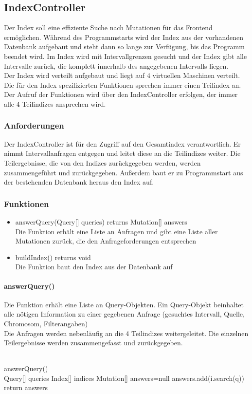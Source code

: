 \subsection{IndexController}
Der Index soll eine effiziente Suche nach Mutationen für das Frontend ermöglichen. Während des Programmstarts wird der Index aus der vorhandenen Datenbank aufgebaut und steht dann so lange zur Verfügung, bis das Programm beendet wird.
Im Index wird mit Intervallgrenzen gesucht und der Index gibt alle Intervalle zurück, die komplett innerhalb des angegebenen Intervalls liegen.\\
Der Index wird verteilt aufgebaut und liegt auf 4 virtuellen Maschinen verteilt. Die für den Index spezifizierten Funktionen sprechen immer einen Teilindex an. Der Aufruf der Funktionen wird über den IndexController erfolgen, der immer alle 4 Teilindizes ansprechen wird.
\subsubsection{Anforderungen}
Der IndexController ist für den Zugriff auf den Gesamtindex verantwortlich. Er nimmt Intervallanfragen entgegen und leitet diese an die Teilindizes weiter.
Die Teilergebnisse, die von den Indizes zurückgegeben werden, werden zusammengeführt und zurückgegeben.
Außerdem baut er zu Programmstart aus der bestehenden Datenbank heraus den Index auf.
\subsubsection{Funktionen}
\begin{itemize}
\item answerQuery(Query[] queries) returns Mutation[] answers\\
Die Funktion erhält eine Liste an Anfragen und gibt eine Liste aller Mutationen zurück, die den Anfrageforderungen entsprechen
\item buildIndex() returns void\\
Die Funktion baut den Index aus der Datenbank auf
\end{itemize}
\paragraph{answerQuery()}
Die Funktion erhält eine Liste an Query-Objekten. Ein Query-Objekt beinhaltet alle nötigen Information zu einer gegebenen Anfrage (gesuchtes Intervall, Quelle, Chromosom, Filterangaben)\\
Die Anfragen werden nebenläufig an die 4 Teilindizes weitergeleitet. Die einzelnen Teilergebnisse werden zusammengefasst und zurückgegeben.\\
\\
\begin{algorithm}
answerQuery()\\
Query[] queries\;
Index[] indices\;
Mutation[] answers=null\;
{
{answers.add(i.search(q))\;}
}
return answers\;
\end{algorithm}


